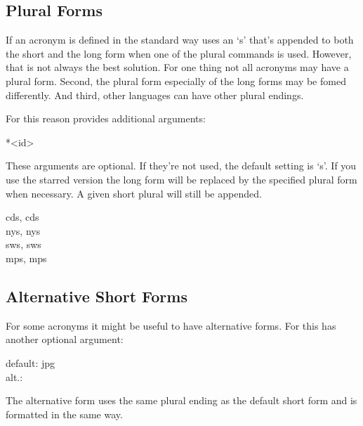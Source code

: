 \documentclass[DIV10,toc=index,toc=bib,hyperfootnotes=false]{cnpkgdoc}
\begin{document}
\subsection{Plural Forms}
If an acronym is defined in the standard way \acro uses an `s' that's appended to
both the short and the long form when one of the plural commands is used. However,
that is not always the best solution. For one thing not all acronyms may have a
plural form. Second, the plural form especially of the long forms may be fomed
differently. And third, other languages can have other plural endings.

For this reason  provides additional arguments:
\begin{beschreibung}
 *{<id>}
\end{beschreibung}
These arguments are optional. If they're not used, the default setting is `s'.
If you use the starred version the long form will be replaced by the specified
plural form when necessary. A given short plural will still be appended.

\begin{beispiel}
 \acsp{cd}, \aclp{cd} \\
 \acsp{ny}, \aclp{ny} \\
 \acsp{sw}, \aclp{sw} \\
 \acsp{mp}, \aclp{mp}
\end{beispiel}

\subsection{Alternative Short Forms}
For some acronyms it might be useful to have alternative forms. For this
 has another optional argument:
\begin{beschreibung}
\end{beschreibung}
\begin{beispiel}
 default: \acs{jpg} \\
 alt.: 
\end{beispiel}
The alternative form uses the same plural ending as the default short form and
is formatted in the same way.
\end{document}
